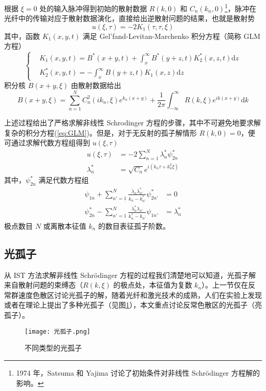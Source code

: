 根据 $\xi=0$ 处的输入脉冲得到初始的散射数据 $R(k,0)$ 和 $C_n(k_n,0)$\footnote{1974 年，Satsuma 和 Yajima 讨论了初始条件对非线性 Schr\"odinger 方程解的影响。}，脉冲在光纤中的传输对应于散射数据演化，直接给出逆散射问题的结果，也就是散射势
\begin{equation}
    u(\xi,\tau)=-2K_1(\tau,\tau,\xi)
\end{equation}
其中，函数 $K_1(x,y,t)$ 满足 Gel'fand-Levitan-Marchenko 积分方程（简称 GLM 方程）
\begin{equation}
    \left\{\begin{aligned}
        &K_1(x,y,t)=B^*(x+y,t)+\int_x^\infty B^*(y+z,t)K_2^*(x,z,t)\mathrm{d}z\\
        &K_2^*(x,y,t)=-\int_x^\infty B(y+z,t)K_1(x,z)\mathrm{d}z
    \end{aligned}\right.
    \label{eq:GLM}
\end{equation}
积分核 $B(x+y,\xi)$ 由散射数据给出
\begin{equation}
    B(x+y,\xi)=\sum_{n=1}^NC^2_n(ik_n,\xi)e^{k_n(x+y)}+\frac{1}{2\pi}\int_{-\infty}^{\infty}R(k,\xi)e^{ik(x+y)}\mathrm{d}k
\end{equation}

上述过程给出了严格求解非线性 Schrodinger 方程的步骤，其中不可避免地要求解复杂的积分方程(\ref{eq:GLM})。但是，对于无反射的孤子解情形 $R(k,0)=0$，便可通过求解代数方程组得到 $u(\xi,\tau)$
\begin{align}
    u(\xi,\tau)&=-2\sum_{n=1}^{N}\lambda_n^*\psi_{2n}^* 
    \label{eq:soliton}\\
    \lambda_n^*&=\sqrt{C_n}e^{i(k_n\tau+k_n^2\xi)} \nonumber
\end{align}
其中，$\psi_{2n}^*$ 满足代数方程组
\begin{equation}
    \begin{aligned}
        \psi_{1n}+\sum_{n'=1}^N\frac{\lambda_n\lambda_{n'}^*}{k_n-k^*_{n'}}\psi^*_{2n'}&=0\\
        \psi_{2n}^*-\sum_{n'=1}^N\frac{\lambda^*_{n}\lambda_{n'}}{k^*_n-k_{n'}}\psi_{1n'}&=\lambda_n^*
    \end{aligned}
\end{equation}
极点数目 $N$ 或离散本征值 $k_n$ 的数目表征孤子阶数。
\subsection{光孤子}
从 IST 方法求解非线性 Schr\"odinger 方程的过程我们清楚地可以知道，光孤子解来自散射问题的束缚态（$R(k,\xi)$ 的极点处，本征值为复数 $k_n$）。上一节仅在反常群速度色散区讨论光孤子的解，随着光纤和激光技术的成熟，人们在实验上发现或者在理论上提出了多种光孤子（见图\ref{fig:optical soliton}），本文重点讨论反常色散区的光孤子（亮孤子）\cite{Agrawal}。
\begin{figure}[hbtp]
    \centering
    \texttt{[image: 光孤子.png]}
    \caption{不同类型的光孤子}
    \label{fig:optical soliton}
\end{figure}

